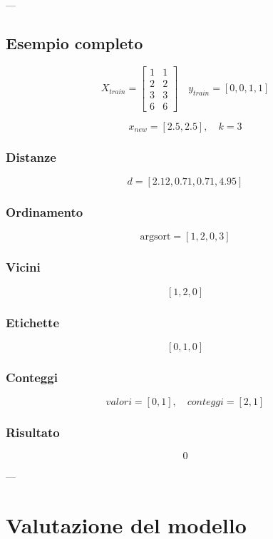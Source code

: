 \documentclass[a4paper,12pt]{article}
\begin{document}
	---
	
	\subsection{Esempio completo}
	
	\[
	X_{train} =
	\begin{bmatrix}
		1 & 1 \\
		2 & 2 \\
		3 & 3 \\
		6 & 6
	\end{bmatrix}
	\quad
	y_{train} = [0,0,1,1]
	\]
	
	\[
	x_{new} = [2.5,2.5], \quad k=3
	\]
	
	\subsubsection{Distanze}
	
	\[
	d = [2.12, 0.71, 0.71, 4.95]
	\]
	
	\subsubsection{Ordinamento}
	
	\[
	\text{argsort} = [1,2,0,3]
	\]
	
	\subsubsection{Vicini}
	
	\[
	[1,2,0]
	\]
	
	\subsubsection{Etichette}
	
	\[
	[0,1,0]
	\]
	
	\subsubsection{Conteggi}
	
	\[
	valori = [0,1], \quad conteggi = [2,1]
	\]
	
	\subsubsection{Risultato}
	
	\[
	\boxed{0}
	\]
	
	---
	
	\section{Valutazione del modello}
	
\end{document}
